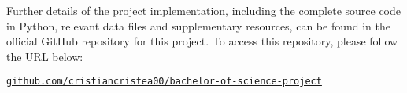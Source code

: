 \label{chaper:code}

Further details of the project implementation, including the complete source code in Python, relevant data files and supplementary resources, can be found in the official GitHub repository for this project. To access this repository, please follow the URL below:

\vspace{1cm}
\begin{center}
    \large\href{https://github.com/cristiancristea00/bachelor-of-science-project}{\texttt{github.com/cristiancristea00/bachelor-of-science-project}}
\end{center}
